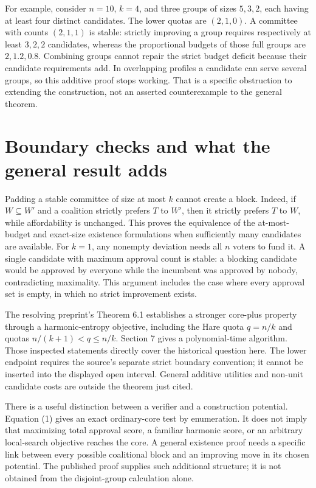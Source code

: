 \documentclass[11pt]{article}
\begin{document}
For example, consider $n=10$, $k=4$, and three groups of sizes $5,3,2$,
each having at least four distinct candidates. The lower quotas are
$(2,1,0)$. A committee with counts $(2,1,1)$ is stable: strictly
improving a group requires respectively at least $3,2,2$ candidates,
whereas the proportional budgets of those full groups are $2,1.2,0.8$.
Combining groups cannot repair the strict budget deficit because their
candidate requirements add. In overlapping profiles a candidate can
serve several groups, so this additive proof stops working. That is a
specific obstruction to extending the construction, not an asserted
counterexample to the general theorem.

\section*{Boundary checks and what the general result adds}
Padding a stable committee of size at most $k$ cannot create a block.
Indeed, if $W\subseteq W'$ and a coalition strictly prefers $T$ to $W'$,
then it strictly prefers $T$ to $W$, while affordability is unchanged.
This proves the equivalence of the at-most-budget and exact-size
existence formulations when sufficiently many candidates are available.
For $k=1$, any nonempty deviation needs all $n$ voters to fund it. A
single candidate with maximum approval count is stable: a blocking
candidate would be approved by everyone while the incumbent was approved
by nobody, contradicting maximality. This argument includes the case
where every approval set is empty, in which no strict improvement exists.

The resolving preprint's Theorem 6.1 establishes a stronger core-plus
property through a harmonic-entropy objective, including the Hare quota
$q=n/k$ and quotas $n/(k+1)<q\leq n/k$. Section 7 gives a polynomial-time
algorithm. Those inspected statements directly cover the historical
question here. The lower endpoint requires the source's separate strict
boundary convention; it cannot be inserted into the displayed open
interval. General additive utilities and non-unit candidate costs are
outside the theorem just cited.

There is a useful distinction between a verifier and a construction
potential. Equation (1) gives an exact ordinary-core test by enumeration.
It does not imply that maximizing total approval score, a familiar
harmonic score, or an arbitrary local-search objective reaches the core.
A general existence proof needs a specific link between every possible
coalitional block and an improving move in its chosen potential. The
published proof supplies such additional structure; it is not obtained
from the disjoint-group calculation alone.
\end{document}
